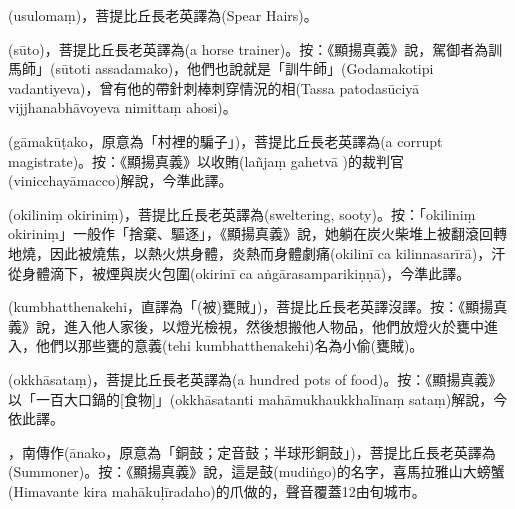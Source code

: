 \startitemgroup[noteitems]
\item{}(usulomaṃ)，菩提比丘長老英譯為(Spear Hairs)。
\stopitemgroup

\startitemgroup[noteitems]
\item{}(sūto)，菩提比丘長老英譯為(a horse trainer)。按：《顯揚真義》說，駕御者為訓馬師」(sūtoti assadamako)，他們也說就是「訓牛師」(Godamakotipi vadantiyeva)，曾有他的帶針刺棒刺穿情況的相(Tassa patodasūciyā vijjhanabhāvoyeva nimittaṃ ahosi)。
\stopitemgroup

\startitemgroup[noteitems]
\item{}(gāmakūṭako，原意為「村裡的騙子」)，菩提比丘長老英譯為(a corrupt magistrate)。按：《顯揚真義》以收賄(lañjaṃ gahetvā )的裁判官(vinicchayāmacco)解說，今準此譯。
\stopitemgroup

\startitemgroup[noteitems]
\item{}(okiliniṃ okiriniṃ)，菩提比丘長老英譯為(sweltering, sooty)。按：「okiliniṃ okiriniṃ」一般作「捨棄、驅逐」，《顯揚真義》說，她躺在炭火柴堆上被翻滾回轉地燒，因此被燒焦，以熱火烘身體，炎熱而身體劇痛(okilinī ca kilinnasarīrā)，汗從身體滴下，被煙與炭火包圍(okirinī ca aṅgārasamparikiṇṇā)，今準此譯。
\stopitemgroup

\startitemgroup[noteitems]
\item{}(kumbhatthenakehi，直譯為「(被)甕賊」)，菩提比丘長老英譯沒譯。按：《顯揚真義》說，進入他人家後，以燈光檢視，然後想搬他人物品，他們放燈火於甕中進入，他們以那些甕的意義(tehi kumbhatthenakehi)名為小偷(甕賊)。
\stopitemgroup

\startitemgroup[noteitems]
\item{}(okkhāsataṃ)，菩提比丘長老英譯為(a hundred pots of food)。按：《顯揚真義》以「一百大口鍋的[食物]」(okkhāsatanti mahāmukhaukkhalīnaṃ sataṃ)解說，今依此譯。
\stopitemgroup

\startitemgroup[noteitems]
\item{}，南傳作(ānako，原意為「銅鼓；定音鼓；半球形銅鼓」)，菩提比丘長老英譯為(Summoner)。按：《顯揚真義》說，這是鼓(mudiṅgo)的名字，喜馬拉雅山大螃蟹(Himavante kira mahākuḷīradaho)的爪做的，聲音覆蓋12由旬城市。
\stopitemgroup

